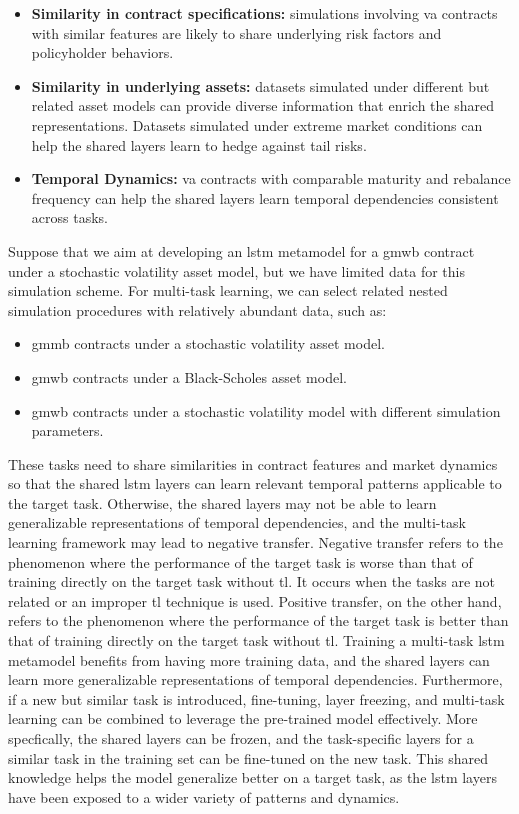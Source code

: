 \begin{itemize} 
    \item   \textbf{Similarity in contract specifications:} 
            simulations involving \gls{va} contracts with similar features are likely to share underlying risk factors and policyholder behaviors. 
    \item   \textbf{Similarity in underlying assets:} 
            datasets simulated under different but related asset models can provide diverse information that enrich the shared representations.
            Datasets simulated under extreme market conditions can help the shared layers learn to hedge against tail risks.
    \item   \textbf{Temporal Dynamics:} 
            \gls{va} contracts with comparable maturity and rebalance frequency can help the shared layers learn temporal dependencies consistent across tasks. 
\end{itemize}

Suppose that we aim at developing an \gls{lstm} metamodel for a \gls{gmwb} contract under a stochastic volatility asset model, but we have limited data for this simulation scheme. 
For multi-task learning, we can select related nested simulation procedures with relatively abundant data, such as:

\begin{itemize} 
    \item \gls{gmmb} contracts under a stochastic volatility asset model. 
    \item \gls{gmwb} contracts under a Black-Scholes asset model. 
    \item \gls{gmwb} contracts under a stochastic volatility model with different simulation parameters.
\end{itemize}

These tasks need to share similarities in contract features and market dynamics so that the shared \gls{lstm} layers can learn relevant temporal patterns applicable to the target task.
Otherwise, the shared layers may not be able to learn generalizable representations of temporal dependencies, and the multi-task learning framework may lead to negative transfer.
Negative transfer refers to the phenomenon where the performance of the target task is worse than that of training directly on the target task without \gls{tl}.
It occurs when the tasks are not related or an improper \gls{tl} technique is used.
Positive transfer, on the other hand, refers to the phenomenon where the performance of the target task is better than that of training directly on the target task without \gls{tl}.
Training a multi-task \gls{lstm} metamodel benefits from having more training data, and the shared layers can learn more generalizable representations of temporal dependencies.
Furthermore, if a new but similar task is introduced, fine-tuning, layer freezing, and multi-task learning can be combined to leverage the pre-trained model effectively.
More specfically, the shared layers can be frozen, and the task-specific layers for a similar task in the training set can be fine-tuned on the new task.
This shared knowledge helps the model generalize better on a target task, as the \gls{lstm} layers have been exposed to a wider variety of patterns and dynamics.

